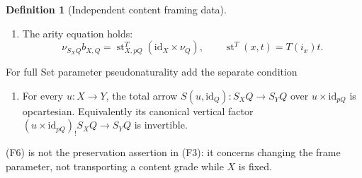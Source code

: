 \documentclass[11pt,a4paper]{article}
\theoremstyle{definition}
\newtheorem{definition}[theorem]{Definition}
\newcommand{\id}{\mathrm{id}}
\begin{document}
\begin{definition}[Independent content framing data]
\begin{enumerate}[label=\textup{(F\arabic*)}]
crossing.
\item The arity equation holds:
\begin{equation}\label{eq:frame-arity}
 \nu_{S_XQ}b_{X,Q}=\operatorname{st}^T_{X,pQ}
 (\id_X\times\nu_Q),\qquad
 \operatorname{st}^T(x,t)=T(i_x)t.
\end{equation}
\end{enumerate}
For full Set parameter pseudonaturality add the separate condition
\begin{enumerate}[label=\textup{(F6)},start=6]
\item For every $u:X\to Y$, the total arrow
$S(u,\id_Q):S_XQ\to S_YQ$ over $u\times\id_{pQ}$ is opcartesian.
Equivalently its canonical vertical factor
$(u\times\id_{pQ})_!S_XQ\to S_YQ$ is invertible.
\end{enumerate}
(F6) is not the preservation assertion in (F3): it concerns changing the
frame parameter, not transporting a content grade while $X$ is fixed.
\end{definition}
\end{document}
